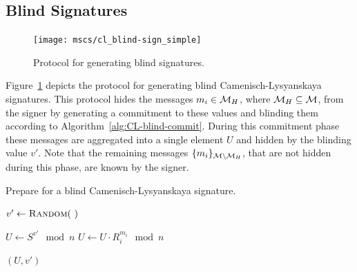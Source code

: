 \subsection{Blind Signatures\label{sec:cl_blind}}
\begin{figure}[ht]
  \centering
  \texttt{[image: mscs/cl\_blind-sign\_simple]}
  \caption{Protocol for generating blind signatures.}
  \label{msc:cl_blind-sign}
\end{figure}

Figure~\ref{msc:cl_blind-sign} depicts the protocol for generating blind
Camenisch-Lysyanskaya signatures. This protocol hides the messages
$m_i \in \mathcal{M}_H$, where $\mathcal{M}_H \subseteq \mathcal{M}$, from the signer by generating a
commitment to these values and blinding them according to
Algorithm~\ref{alg:CL-blind-commit}. During this commitment phase these
messages are aggregated into a single element $U$ and hidden by the blinding
value $v'$. Note that the remaining messages $\{m_i\}_{\mathcal{M} \setminus \mathcal{M}_H}$,
that are not hidden during this phase, are known by the signer.

\begin{algorithm}
  \caption{Prepare for a blind Camenisch-Lysyanskaya signature.}
  \label{alg:CL-blind-commit}
  \addtolength{\baselineskip}{1mm}
  \begin{algorithmic}[1]
      \State $v' \gets \Call{Random}{~}$

      \State $U \gets S^{v'} \mod n$
        \State $U \gets U \cdot R_i^{m_i} \mod n$
      \EndFor

      \Return $(U, v')$
    \EndFunction
  \end{algorithmic}
\end{algorithm}

